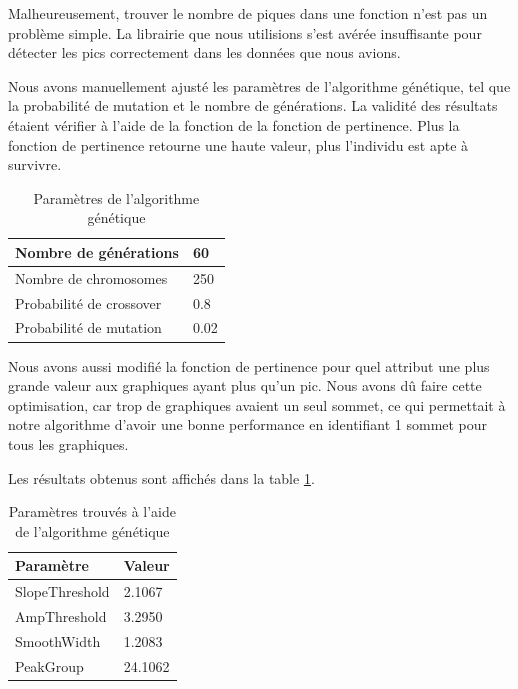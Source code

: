 \documentclass[12pt,letterpaper]{article}
\begin{document}
Malheureusement, trouver le nombre de piques dans une fonction n'est pas un problème simple. La librairie que nous utilisions
s'est avérée insuffisante pour détecter les pics correctement dans les données que nous avions.

Nous avons manuellement ajusté les paramètres de l'algorithme génétique, tel que la probabilité de mutation et le nombre de générations.
La validité des résultats étaient vérifier à l'aide de la fonction de la fonction de pertinence. Plus la fonction de pertinence retourne
une haute valeur, plus l'individu est apte à survivre.

\begin{table}[h]
  \begin{center}
    \begin{tabular} {|l|l|}
        \hline
        Nombre de générations & 60 \\
        \hline
        Nombre de chromosomes & 250 \\
        \hline
        Probabilité de crossover & 0.8 \\
        \hline
        Probabilité de mutation & 0.02 \\
        \hline
    \end{tabular}
    \caption{Paramètres de l'algorithme génétique}
  \end{center}
\end{table}

Nous avons aussi modifié la fonction de pertinence pour quel attribut une plus grande valeur aux graphiques ayant plus qu’un pic.
Nous avons dû faire cette optimisation, car trop de graphiques avaient un seul sommet, ce qui permettait à notre algorithme d'avoir une bonne
performance en identifiant 1 sommet pour tous les graphiques.

Les résultats obtenus sont affichés dans la table \ref{tab:genparam}.

\begin{table}[h]
  \begin{center}
    \begin{tabular} {|l|l|}
        \hline
        \bf{Paramètre} & \bf{Valeur} \\
        \hline
        SlopeThreshold & 2.1067 \\
        \hline
        AmpThreshold & 3.2950 \\
        \hline
        SmoothWidth & 1.2083 \\
        \hline
        PeakGroup & 24.1062 \\
        \hline
    \end{tabular}
    \caption{Paramètres trouvés à l'aide de l'algorithme génétique}
    \label{tab:genparam}
  \end{center}
\end{table}
\end{document}
